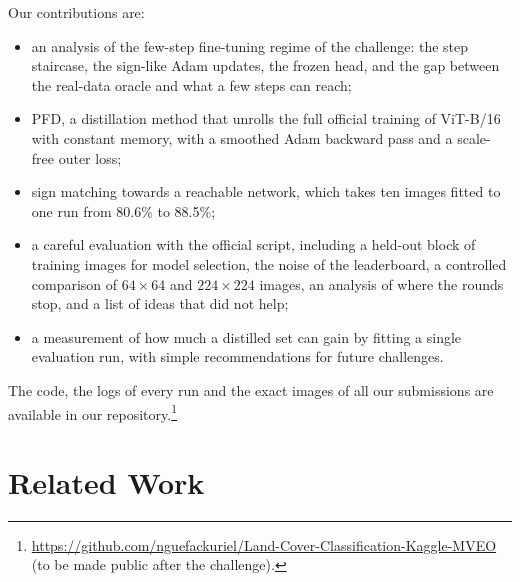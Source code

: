 \documentclass[journal]{IEEEtran}
\begin{document}
Our contributions are:
\begin{itemize}
\item an analysis of the few-step fine-tuning regime of the challenge: the step staircase, the sign-like Adam
updates, the frozen head, and the gap between the real-data oracle and what a few steps can reach;
\item PFD, a distillation method that unrolls the full official training of ViT-B/16 with constant memory, with a
smoothed Adam backward pass and a scale-free outer loss;
\item sign matching towards a reachable network, which takes ten images fitted to one run from 80.6\% to 88.5\%;
\item a careful evaluation with the official script, including a held-out block of training images for model
selection, the noise of the leaderboard, a controlled comparison of $64\times64$ and $224\times224$ images, an
analysis of where the rounds stop, and a list of ideas that did not help;
\item a measurement of how much a distilled set can gain by fitting a single evaluation run, with simple
recommendations for future challenges.
\end{itemize}
The code, the logs of every run and the exact images of all our submissions are available in our
repository.\footnote{\url{https://github.com/nguefackuriel/Land-Cover-Classification-Kaggle-MVEO} (to be made public after the challenge).}

\section{Related Work}
\end{document}
